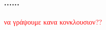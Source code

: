 \documentclass{beamer}
\begin{document}
\begin{frame}\frametitle{......}\framesubtitle{}
\textcolor{red}{να γράψουμε κανα κονκλουσιον??}
\end{frame}


% 
% 
\end{document}
